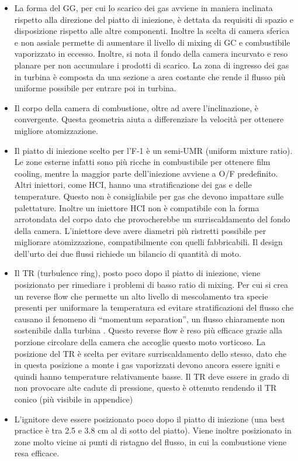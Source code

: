 \documentclass[11pt,a4paper]{article}
\begin{document}
\begin{itemize}[wide,itemsep=3pt,topsep=3pt]

\item
La forma del GG, per cui lo scarico dei gas avviene in maniera inclinata rispetto alla direzione del piatto di iniezione, è dettata da requisiti di spazio e disposizione rispetto alle altre componenti. Inoltre la scelta di camera sferica e non assiale permette di aumentare il livello di mixing di GC e combustibile vaporizzato in eccesso. Inoltre, si nota il fondo della camera incurvato e reso planare per non accumulare i prodotti di scarico. La zona di ingresso dei gas in turbina è composta da una sezione a area costante che rende il flusso più uniforme possibile per entrare poi in turbina.
\item
Il corpo della camera di combustione, oltre ad avere l’inclinazione, è convergente. Questa geometria aiuta a differenziare la velocità per ottenere migliore atomizzazione. 
\item
Il piatto di iniezione scelto per l’F-1 è un semi-UMR (uniform mixture ratio). Le zone esterne infatti sono più ricche in combustibile per ottenere film cooling, mentre la maggior parte dell’iniezione avviene a O/F predefinito. Altri iniettori, come HCI, hanno una stratificazione dei gas e delle temperature. Questo non è consigliabile per gas che devono impattare sulle palettature. Inoltre un iniettore HCI non è compatibile con la forma arrotondata del corpo dato che provocherebbe un surriscaldamento del fondo della camera. L’iniettore deve avere diametri più ristretti possibile per migliorare atomizzazione, compatibilmente con quelli fabbricabili. Il design dell’urto dei due flussi richiede un bilancio di quantità di moto. 
\item
Il TR (turbulence ring), posto poco dopo il piatto di iniezione, viene posizionato per rimediare i problemi di basso ratio di mixing. Per cui si crea un reverse flow che permette un alto livello di mescolamento tra specie presenti per uniformare la temperatura ed evitare stratificazioni del flusso che causano il fenomeno di “momentum separation”, un flusso chiaramente non sostenibile dalla turbina . Questo reverse flow è reso più efficace grazie alla porzione circolare della camera che accoglie questo moto vorticoso. La posizione del TR è scelta per evitare surriscaldamento dello stesso, dato che in questa posizione a monte i gas vaporizzati devono ancora essere igniti e quindi hanno temperature relativamente basse. Il TR deve essere in grado di non provocare alte cadute di pressione, questo è ottenuto rendendo il TR conico (più visibile in appendice)
\item
L’ignitore deve essere posizionato poco dopo il piatto di iniezione (una best practice è tra 2.5 e 3.8 cm al di sotto del piatto). Viene inoltre posizionato in zone molto vicine ai punti di ristagno del flusso, in cui la combustione viene resa efficace.


\end{itemize}
\end{document}
